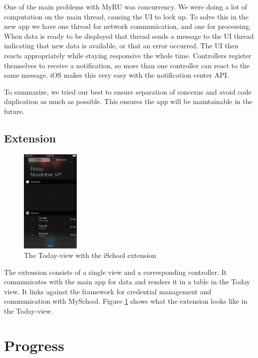 \documentclass[pdftex, DIV=calc, paper=a4, fontsize=11pt]{scrartcl}	 %
\begin{document}
One of the main problems with MyRU was concurrency. We were doing a lot of computation on 
the main thread, causing the UI to lock up. To solve this in the new app we have one thread for 
network communication, and one for processing. When data is ready to be displayed that thread sends
a message to the UI thread indicating that new data is available, or that an error occurred. The UI
then reacts appropriately while staying responsive the whole time. Controllers register themselves 
to receive a notification, so more than one controller can react to the same message. iOS makes this
very easy with the notification center API.

To summarize, we tried our best to ensure separation of concerns and avoid code duplication as much
as possible. This ensures the app will be maintainable in the future.

\subsection{Extension}

\begin{figure}
    \centering
    \includegraphics[width=0.25\textwidth]{widget.png}
    \caption{The Today-view with the iSchool extension}
    \label{fig:today}
\end{figure}

The extension consists of a single view and a corresponding controller. It communicates with the
main app for data and renders it in a table in the Today view. It links against the framework for 
credential management and communication with MySchool. Figure \ref{fig:today} shows what the
extension looks like in the Today-view.


\section{Progress}
\label{sec:progress}
\end{document}
